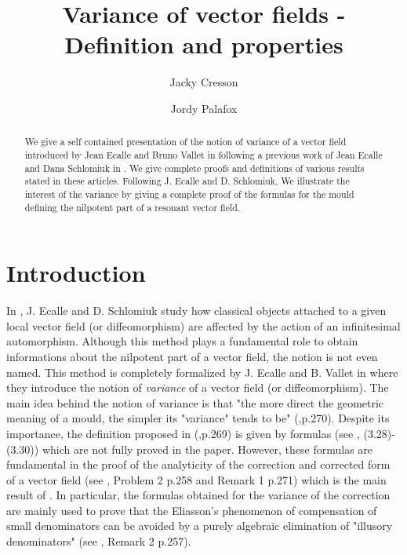 \documentclass[english,11pt]{amsart}
\author{Jacky Cresson}
\author{Jordy Palafox}
\begin{document}
\title{Variance of vector fields - Definition and properties}
 


\maketitle

 



\begin{abstract}

We give a self contained presentation of the notion of variance of a vector field introduced by Jean Ecalle and Bruno Vallet in \cite{ev} following a previous work of Jean Ecalle and Dana Schlomiuk in \cite{es}. We give complete proofs and definitions of various results stated in these articles. Following J. Ecalle and D. Schlomiuk, We illustrate the interest of the variance by giving a complete proof of the formulas for the mould defining the nilpotent part of a resonant vector field. 
\end{abstract}

\setcounter{tocdepth}{3}
\tableofcontents

\section{Introduction}

In \cite{es}, J. Ecalle and D. Schlomiuk study how classical objects attached to a given local vector field (or diffeomorphism) are affected by the action of an infinitesimal automorphism. Although this method plays a fundamental role to obtain informations about the nilpotent part of a vector field, the notion is not even named. This method is completely formalized by J. Ecalle and B. Vallet in \cite{ev} where they introduce the notion of {\it variance} of a vector field (or diffeomorphism). The main idea behind the notion of variance is that "the more direct the geometric meaning of a mould, the simpler its "variance" tends to be" (\cite{ev},p.270). Despite its importance, the definition proposed in (\cite{ev},p.269) is given  by formulas (see \cite{ev}, (3.28)-(3.30)) which are not fully proved in the paper. However, these formulas are fundamental in the proof of the analyticity of the correction and corrected form of a vector field (see \cite{ev}, Problem 2 p.258 and Remark 1 p.271) which is the main result of \cite{ev}. In particular, the formulas obtained for the variance of the correction are mainly used to prove that the Eliasson's phenomenon of compensation of small denominators can be avoided by a purely algebraic elimination of "illusory denominators" (see \cite{ev}, Remark 2 p.257). \\
\end{document}
